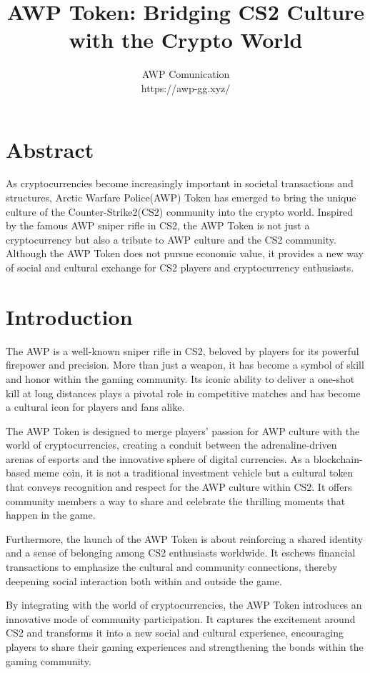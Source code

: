 \documentclass[journal,onecolumn,]{IEEEtran}
\title{AWP Token: Bridging CS2 Culture \\ with the Crypto World}
\author{AWP Comunication \\ https://awp-gg.xyz/}
\date{}
\begin{document}
	
	\maketitle
	
	\section*{Abstract}
	As cryptocurrencies become increasingly important in societal transactions and structures, Arctic Warfare Police(AWP) Token has emerged to bring the unique culture of the Counter-Strike2(CS2) community into the crypto world. Inspired by the famous AWP sniper rifle in CS2, the AWP Token is not just a cryptocurrency but also a tribute to AWP culture and the CS2 community. Although the AWP Token does not pursue economic value, it provides a new way of social and cultural exchange for CS2 players and cryptocurrency enthusiasts. 
	
	\section{Introduction}
	
	The AWP is a well-known sniper rifle in CS2\cite{CSGOBombCode}, beloved by players for its powerful firepower and precision. More than just a weapon, it has become a symbol of skill and honor within the gaming community. Its iconic ability to deliver a one-shot kill at long distances plays a pivotal role in competitive matches and has become a cultural icon for players and fans alike.
	
	The AWP Token is designed to merge players' passion for AWP culture\cite{PixelsUnderstandingSignificance} with the world of cryptocurrencies, creating a conduit between the adrenaline-driven arenas of esports and the innovative sphere of digital currencies. As a blockchain-based meme coin, it is not a traditional investment vehicle but a cultural token that conveys recognition and respect for the AWP culture within CS2. It offers community members a way to share and celebrate the thrilling moments that happen in the game.
	
	Furthermore, the launch of the AWP Token is about reinforcing a shared identity and a sense of belonging among CS2 enthusiasts worldwide. It eschews financial transactions to emphasize the cultural and community connections, thereby deepening social interaction both within and outside the game.
	
	By integrating with the world of cryptocurrencies, the AWP Token introduces an innovative mode of community participation\cite{nakamotoBitcoinPeertoPeerElectronic}. It captures the excitement around CS2 and transforms it into a new social and cultural experience, encouraging players to share their gaming experiences and strengthening the bonds within the gaming community.
	
\end{document}
